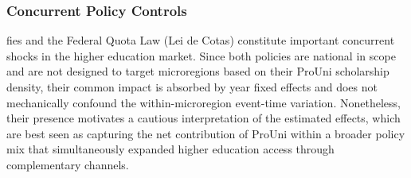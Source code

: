 \subsubsection{Concurrent Policy Controls}
\label{sec:robustness_fies}

\acrshort{fies} and the Federal Quota Law (Lei de Cotas) constitute important concurrent shocks in the higher education market. Since both policies are national in scope and are not designed to target microregions based on their ProUni scholarship density, their common impact is absorbed by year fixed effects and does not mechanically confound the within-microregion event-time variation. Nonetheless, their presence motivates a cautious interpretation of the estimated effects, which are best seen as capturing the net contribution of ProUni within a broader policy mix that simultaneously expanded higher education access through complementary channels.

